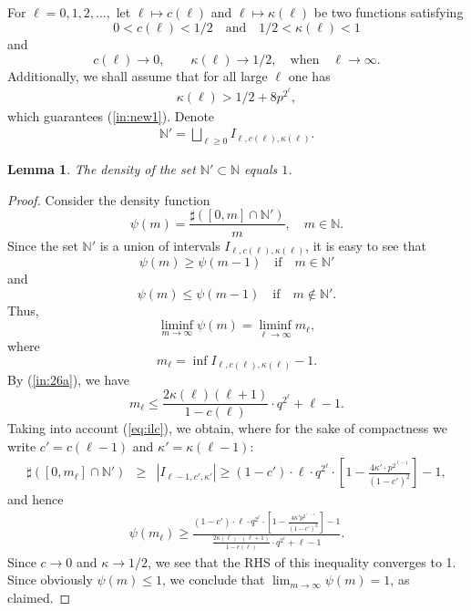 \documentclass[10pt,a4paper]{amsart}
\newtheorem{lema}{Lemma}
\newcommand{\N}{\mathbb{N}}
\begin{document}
\subsection{} For $\ell=0, 1, 2, \dots,$ let $\ell \mapsto c(\ell)$ and $\ell\mapsto \kappa(\ell)$ be two functions satisfying 
$$0<c(\ell)<1/2\quad\mbox{and}\quad  
1/2<\kappa(\ell)<1$$ 
and 
$$c(\ell)\to 0,\quad\mbox{}\quad \kappa(\ell)\to 1/2,\quad \mbox{when}\quad \ell\to \infty.$$ 
Additionally, we shall assume that for all large $\ell$ one has
\begin{eqnarray}\label{eq:30a}
\kappa(\ell)  >1/2 + 8p^{2^{\ell}},
\end{eqnarray}
which guarantees (\ref{in:new1}). %
Denote
\begin{eqnarray*}\label{eq:nprime}
\N'=\bigsqcup_{\ell\ge 0} I_{\ell, c(\ell), \kappa(\ell)}.
\end{eqnarray*}
\begin{lema}
The density of the set $\N'\subset \N$ equals $1$. 
\end{lema} 
\begin{proof} Consider the density function
$$
\psi(m) =\frac{ \sharp([0, m]\cap \N')}{m}, \quad m\in \N. 
$$
Since the set $\N'$ is a union of intervals $I_{\ell, c(\ell), \kappa(\ell)}$, it is easy to see that 
$$\psi(m)\ge \psi(m-1) \quad \mbox{if}\quad  m\in \N'$$
 and 
 $$\psi(m)\le  \psi(m-1) \quad \mbox{if}\quad  m\notin \N'.$$
 Thus, 
 $$\liminf_{m\to \infty} \psi(m) = \liminf_{\ell\to \infty} m_\ell,$$ where %
 $$m_\ell= \inf I_{\ell, c(\ell), \kappa(\ell)}-1. $$
By (\ref{in:26a}),
we have
$$
m_\ell\le  \frac{2\kappa(\ell) (\ell+1)}{1-c(\ell)}\cdot q^{2^{\ell}}+\ell -1.
$$ 
Taking into account (\ref{eq:ilc}), we obtain, where for the sake of compactness we write $c'=c(\ell-1)$ and $\kappa'=\kappa(\ell-1)$:
\begin{eqnarray*}
\sharp ([0, m_\ell]\cap \N') &\ge& |I_{\ell-1, c',\kappa'}|
\ge 
(1-c')\cdot \ell \cdot q^{2^{\ell}}\cdot \left[1-\frac{4\kappa'\cdot p^{2^{\ell-1}}}{(1-c')^2}\right]-1,\end{eqnarray*}
and hence
\begin{eqnarray*}
\psi(m_\ell) \ge \frac{(1-c')\cdot \ell \cdot q^{2^{\ell}}\cdot \left[1-\frac{4\kappa' p^{2^{\ell-1}}}{(1-c')^2}\right]-1}{\frac{2\kappa(\ell) \cdot (\ell+1)}{1-c(\ell)}\cdot q^{2^{\ell}}+\ell -1}.
\end{eqnarray*}
Since $c\to 0$ and $\kappa\to 1/2$, we see that the RHS of this inequality converges to 1. 
Since obviously $\psi(m)\le 1$, we conclude that $\lim_{m\to \infty} \psi(m)=1$, as claimed. 
\end{proof}
\end{document}
